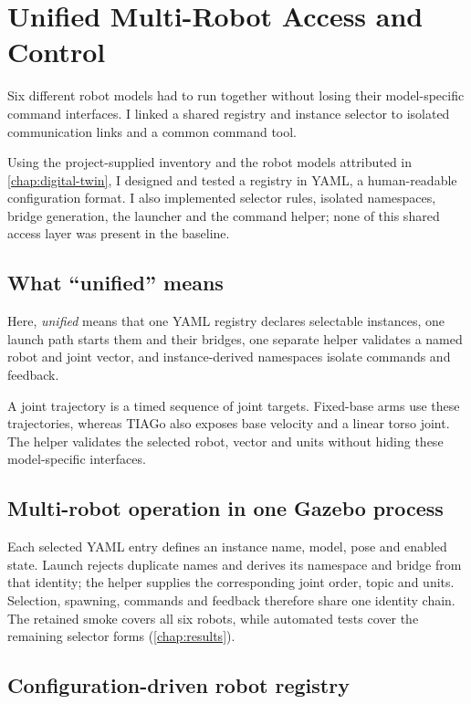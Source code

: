 \chapter{Unified Multi-Robot Access and Control}
\label{chap:multi-robot}

Six different robot models had to run together without losing their
model-specific command interfaces. I linked a shared registry and instance
selector to isolated communication links and a common command tool.

Using the project-supplied inventory and the robot models attributed in
\cref{chap:digital-twin}, I designed and tested a registry in YAML, a
human-readable configuration format.
I also implemented selector rules, isolated namespaces, bridge generation, the
launcher and the command helper; none of this shared access layer was present in
the baseline.

\section{What ``unified'' means}

Here, \emph{unified} means that one YAML registry declares selectable instances,
one launch path starts them and their bridges, one separate helper validates a
named robot and joint vector, and instance-derived namespaces isolate commands
and feedback.

A joint trajectory is a timed sequence of joint targets. Fixed-base arms use
these trajectories, whereas TIAGo also exposes base velocity and a linear torso
joint. The helper validates the selected robot, vector and units without hiding
these model-specific interfaces.

\section{Multi-robot operation in one Gazebo process}

Each selected YAML entry defines an instance name, model, pose and enabled
state. Launch rejects duplicate names and derives its namespace and bridge from
that identity; the helper supplies the corresponding joint order, topic and
units. Selection, spawning, commands and feedback therefore share one identity
chain. The retained smoke covers all six robots, while automated tests cover
the remaining selector forms (\cref{chap:results}).

\section{Configuration-driven robot registry}


